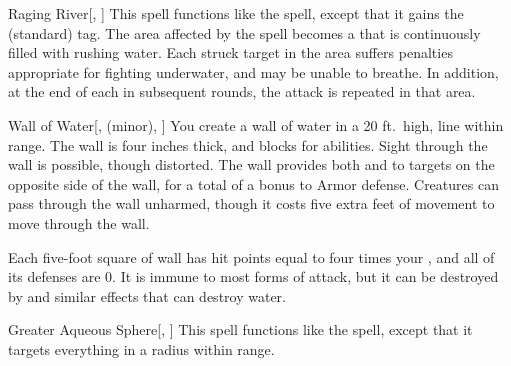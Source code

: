 \lowercase{\hypertarget{spell:Raging River}{}}\label{spell:Raging River}
\begin{freeability}[\nth{3}]{\hypertarget{spell:Raging River}{Raging River}}[, ]
This spell functions like the  spell, except that it gains the  (standard) tag.
The area affected by the spell becomes a  that is continuously filled with rushing water.
Each struck target in the area suffers penalties appropriate for fighting underwater, and may be unable to breathe.
In addition, at the end of each  in subsequent rounds, the attack is repeated in that area.
\end{freeability}
\vspace{0.25em}



\lowercase{\hypertarget{spell:Wall of Water}{}}\label{spell:Wall of Water}
\begin{freeability}[\nth{3}]{\hypertarget{spell:Wall of Water}{Wall of Water}}[,  (minor), ]
You create a wall of water in a 20 ft.\ high, \arealarge line within \rngmed range.
The wall is four inches thick, and blocks  for abilities.
Sight through the wall is possible, though distorted.
The wall provides both  and  to targets on the opposite side of the wall, for a total of a  bonus to Armor defense.
Creatures can pass through the wall unharmed, though it costs five extra feet of movement to move through the wall.

Each five-foot square of wall has hit points equal to four times your , and all of its defenses are 0.
It is immune to most forms of attack, but it can be destroyed by  and similar effects that can destroy water.
\end{freeability}
\vspace{0.25em}



\lowercase{\hypertarget{spell:Greater Aqueous Sphere}{}}\label{spell:Greater Aqueous Sphere}
\begin{freeability}[\nth{5}]{\hypertarget{spell:Greater Aqueous Sphere}{Greater Aqueous Sphere}}[, ]
This spell functions like the  spell, except that it targets everything in a \areamed radius within \rngmed range.
\end{freeability}
\vspace{0.25em}



